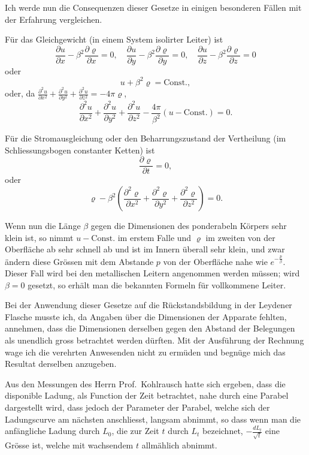 \documentclass[12pt,a4paper]{article}
\begin{document}
Ich werde nun die Consequenzen dieser Gesetze in einigen besonderen Fällen mit der Erfahrung vergleichen.

Für das Gleichgewicht (in einem System isolirter Leiter) ist
\[
\frac{\partial u}{\partial x} - \beta^2 \frac{\partial \varrho}{\partial x} = 0, \quad
\frac{\partial u}{\partial y} - \beta^2 \frac{\partial \varrho}{\partial y} = 0, \quad
\frac{\partial u}{\partial z} - \beta^2 \frac{\partial \varrho}{\partial z} = 0
\]
oder
\[
u + \beta^2 \varrho = \text{Const.},
\]
oder, da $\frac{\partial^2 u}{\partial x^2} + \frac{\partial^2 u}{\partial y^2} + \frac{\partial^2 u}{\partial z^2} = -4\pi \varrho$,
\[
\frac{\partial^2 u}{\partial x^2} + \frac{\partial^2 u}{\partial y^2} + \frac{\partial^2 u}{\partial z^2} - \frac{4\pi}{\beta^2} (u - \text{Const.}) = 0.
\]

Für die Stromausgleichung oder den Beharrungszustand der Vertheilung (im Schliessungsbogen constanter Ketten) ist
\[
\frac{\partial \varrho}{\partial t} = 0,
\]
oder
\[
\varrho - \beta^2 \left(\frac{\partial^2 \varrho}{\partial x^2} + \frac{\partial^2 \varrho}{\partial y^2} + \frac{\partial^2 \varrho}{\partial z^2}\right) = 0.
\]

Wenn nun die Länge $\beta$ gegen die Dimensionen des ponderabeln Körpers sehr klein ist, so nimmt $u - \text{Const.}$ im erstem Falle und $\varrho$ im zweiten von der Oberfläche ab sehr schnell ab und ist im Innern überall sehr klein, und zwar ändern diese Grössen mit dem Abstande $p$ von der Oberfläche nahe wie $e^{-\frac{p}{\beta}}$. Dieser Fall wird bei den metallischen Leitern angenommen werden müssen; wird $\beta = 0$ gesetzt, so erhält man die bekannten Formeln für vollkommene Leiter.

Bei der Anwendung dieser Gesetze auf die Rückstandsbildung in der Leydener Flasche musste ich, da Angaben über die Dimensionen der Apparate fehlten, annehmen, dass die Dimensionen derselben gegen den Abstand der Belegungen als unendlich gross betrachtet werden dürften. Mit der Ausführung der Rechnung wage ich die verehrten Anwesenden nicht zu ermüden und begnüge mich das Resultat derselben anzugeben.

Aus den Messungen des Herrn Prof.~Kohlrausch hatte sich ergeben, dass die disponible Ladung, als Function der Zeit betrachtet, nahe durch eine Parabel dargestellt wird, dass jedoch der Parameter der Parabel, welche sich der Ladungscurve am nächsten anschliesst, langsam abnimmt, so dass wenn man die anfängliche Ladung durch $L_0$, die zur Zeit $t$ durch $L_t$ bezeichnet, $-\frac{dL_t}{\sqrt{t}}$ eine Grösse ist, welche mit wachsendem $t$ allmählich abnimmt.
\end{document}
